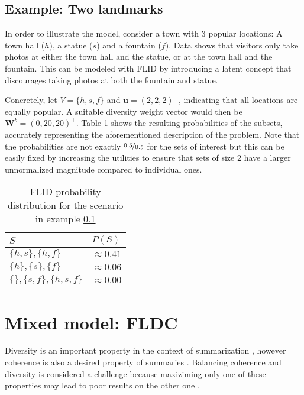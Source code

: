 \subsection{Example: Two landmarks}
\label{sec:flid-toy}

In order to illustrate the model, consider a town with 3 popular locations: A town hall ($h$), a statue ($s$) and a fountain ($f$). Data shows that visitors only take photos at either the town hall and the statue, or at the town hall and the fountain. This can be modeled with FLID by introducing a latent concept that discourages taking photos at both the fountain and statue.

Concretely, let $V = \{h, s, f\}$ and $\mathbf{u} = \left(2, 2, 2\right)^{\intercal}$, indicating that all locations are equally popular. A suitable diversity weight vector would then be $\mathbf{W}^{b} = \left(0, 20, 20\right)^{\intercal}$. Table \ref{tab:flid-toy-probs} shows the resulting probabilities of the subsets, accurately representing the aforementioned description of the problem. Note that the probabilities are not exactly $\nicefrac{0.5}{0.5}$ for the sets of interest but this can be easily fixed by increasing the utilities to ensure that sets of size 2 have a larger unnormalized magnitude compared to individual ones.

\begin{table}
  \centering
  \caption{FLID probability distribution for the scenario in example \ref{sec:flid-toy}}
  \begin{tabular}{@{}ll@{}}
    \toprule
      $S$ & $P(S)$  \\
    \midrule
      $\{h,s\}, \{h,f\}$ & $\approx 0.41$ \\
      $\{h\}, \{s\}, \{f\}$ & $\approx 0.06$ \\
      $\{\}, \{s,f\}, \{h,s,f\}$ & $\approx 0.00$ \\
    \bottomrule
  \end{tabular}
  \label{tab:flid-toy-probs}
\end{table}

\section{Mixed model: FLDC}

Diversity is an important property in the context of summarization \citep{tschiatschek16learning}, however coherence is also a desired property of summaries \citep{Yan:2011:ETS:2009916.2010016}. Balancing coherence and diversity is considered a challenge because maxiziming only one of these properties may lead to poor results on the other one \citep{Shahaf2012}.

